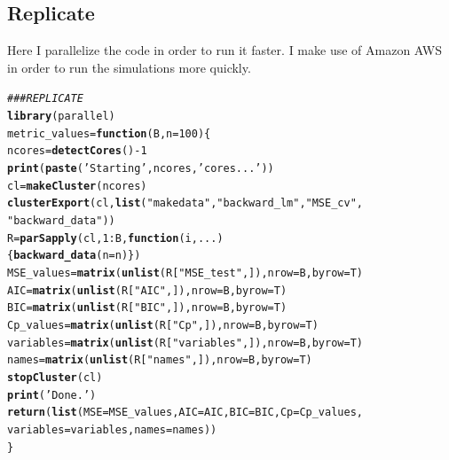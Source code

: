 \documentclass[11pt]{article}\usepackage[]{graphicx}\usepackage[]{color}
\makeatletter
\newcommand{\hlnum}[1]{\textcolor[rgb]{0.686,0.059,0.569}{#1}}%
\newcommand{\hlstr}[1]{\textcolor[rgb]{0.192,0.494,0.8}{#1}}%
\newcommand{\hlcom}[1]{\textcolor[rgb]{0.678,0.584,0.686}{\textit{#1}}}%
\newcommand{\hlopt}[1]{\textcolor[rgb]{0,0,0}{#1}}%
\newcommand{\hlstd}[1]{\textcolor[rgb]{0.345,0.345,0.345}{#1}}%
\newcommand{\hlkwa}[1]{\textcolor[rgb]{0.161,0.373,0.58}{\textbf{#1}}}%
\newcommand{\hlkwb}[1]{\textcolor[rgb]{0.69,0.353,0.396}{#1}}%
\newcommand{\hlkwc}[1]{\textcolor[rgb]{0.333,0.667,0.333}{#1}}%
\newcommand{\hlkwd}[1]{\textcolor[rgb]{0.737,0.353,0.396}{\textbf{#1}}}%
\newenvironment{kframe}{%
 \def\at@end@of@kframe{}%
 \ifinner\ifhmode%
  \def\at@end@of@kframe{\end{minipage}}%
  \begin{minipage}{\columnwidth}%
 \fi\fi%
 \def\FrameCommand##1{\hskip\@totalleftmargin \hskip-\fboxsep
 \colorbox{shadecolor}{##1}\hskip-\fboxsep
     \hskip-\linewidth \hskip-\@totalleftmargin \hskip\columnwidth}%
 \MakeFramed {\advance\hsize-\width
   \@totalleftmargin\z@ \linewidth\hsize
   \@setminipage}}%
 {\par\unskip\endMakeFramed%
 \at@end@of@kframe}
\newenvironment{knitrout}{}{} %
\makeatother
\begin{document}
\subsection{Replicate}
Here I parallelize the code in order to run it faster. I make use of Amazon AWS in order to run the simulations more quickly.
\begin{knitrout}
\color{fgcolor}\begin{kframe}
\begin{alltt}
\hlcom{## # REPLICATE}
\hlkwd{library}\hlstd{(parallel)}
\hlstd{metric_values} \hlkwb{=} \hlkwa{function}\hlstd{(}\hlkwc{B}\hlstd{,}\hlkwc{n}\hlstd{=}\hlnum{100}\hlstd{)\{}
  \hlstd{ncores} \hlkwb{=} \hlkwd{detectCores}\hlstd{()}\hlopt{-}\hlnum{1}
  \hlkwd{print}\hlstd{(}\hlkwd{paste}\hlstd{(}\hlstr{'Starting '}\hlstd{, ncores,} \hlstr{' cores...'}\hlstd{))}
  \hlstd{cl} \hlkwb{=} \hlkwd{makeCluster}\hlstd{(ncores)}
  \hlkwd{clusterExport}\hlstd{(cl,}\hlkwd{list}\hlstd{(}\hlstr{"makedata"}\hlstd{,} \hlstr{"backward_lm"}\hlstd{,} \hlstr{"MSE_cv"}\hlstd{,}
                        \hlstr{"backward_data"}\hlstd{))}
  \hlstd{R} \hlkwb{=} \hlkwd{parSapply}\hlstd{(cl,} \hlnum{1}\hlopt{:}\hlstd{B,} \hlkwa{function}\hlstd{(}\hlkwc{i}\hlstd{,}\hlkwc{...}\hlstd{)}
    \hlstd{\{} \hlkwd{backward_data}\hlstd{(}\hlkwc{n}\hlstd{=n) \} )}
  \hlstd{MSE_values} \hlkwb{=} \hlkwd{matrix}\hlstd{(}\hlkwd{unlist}\hlstd{(R[}\hlstr{"MSE_test"}\hlstd{,]),} \hlkwc{nrow} \hlstd{= B,} \hlkwc{byrow} \hlstd{= T)}
  \hlstd{AIC} \hlkwb{=} \hlkwd{matrix}\hlstd{(}\hlkwd{unlist}\hlstd{(R[}\hlstr{"AIC"}\hlstd{,]),} \hlkwc{nrow} \hlstd{= B,} \hlkwc{byrow} \hlstd{= T)}
  \hlstd{BIC} \hlkwb{=} \hlkwd{matrix}\hlstd{(}\hlkwd{unlist}\hlstd{(R[}\hlstr{"BIC"}\hlstd{,]),} \hlkwc{nrow} \hlstd{= B,} \hlkwc{byrow} \hlstd{= T)}
  \hlstd{Cp_values}  \hlkwb{=} \hlkwd{matrix}\hlstd{(}\hlkwd{unlist}\hlstd{(R[}\hlstr{"Cp"}\hlstd{,]),} \hlkwc{nrow} \hlstd{= B,} \hlkwc{byrow} \hlstd{= T)}
  \hlstd{variables} \hlkwb{=} \hlkwd{matrix}\hlstd{(}\hlkwd{unlist}\hlstd{(R[}\hlstr{"variables"}\hlstd{,]),} \hlkwc{nrow} \hlstd{= B,} \hlkwc{byrow} \hlstd{= T)}
  \hlstd{names} \hlkwb{=} \hlkwd{matrix}\hlstd{(}\hlkwd{unlist}\hlstd{(R[}\hlstr{"names"}\hlstd{,]),} \hlkwc{nrow} \hlstd{= B,} \hlkwc{byrow} \hlstd{= T)}
  \hlkwd{stopCluster}\hlstd{(cl)}
  \hlkwd{print}\hlstd{(}\hlstr{'Done.'}\hlstd{)}
  \hlkwd{return}\hlstd{(}\hlkwd{list}\hlstd{(}\hlkwc{MSE}\hlstd{=MSE_values,} \hlkwc{AIC}\hlstd{=AIC,} \hlkwc{BIC}\hlstd{=BIC,} \hlkwc{Cp}\hlstd{=Cp_values,}
              \hlkwc{variables}\hlstd{=variables,} \hlkwc{names}\hlstd{=names))}
\hlstd{\}}


\end{alltt}
\end{kframe}
\end{knitrout}
\end{document}
